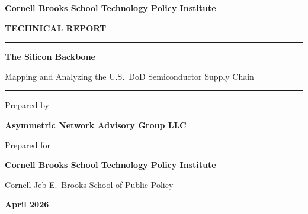 \begin{titlepage}
\thispagestyle{empty}

\noindent\colorbox{carnelian}{%
  \parbox{\dimexpr\textwidth-2\fboxsep}{%
    \centering\vspace{6pt}%
    {\large\color{white}\textbf{Cornell Brooks School Technology Policy Institute}}%
    \vspace{6pt}%
  }%
}\par

\centering

\vspace{1.0in}

{\color{cornellgray}\Large \textbf{TECHNICAL REPORT}}\par

\vspace{0.6in}

{\color{carnelian}\rule{0.6\textwidth}{1pt}}\par
\vspace{0.25in}
{\LARGE \textbf{\color{cornellgray}The Silicon Backbone}}\par
\vspace{0.10in}
{\Large \color{cornellgray}Mapping and Analyzing the U.S.\ DoD Semiconductor Supply Chain}\par
\vspace{0.25in}
{\color{carnelian}\rule{0.6\textwidth}{1pt}}\par

\vspace{0.6in}

{\large\color{cornellgray} Prepared by}\par
\vspace{0.08in}
{\large\textbf{\color{cornellgray}Asymmetric Network Advisory Group LLC}}\par

\vspace{0.4in}

{\large\color{cornellgray} Prepared for}\par
\vspace{0.08in}
{\large\textbf{\color{cornellgray}Cornell Brooks School Technology Policy Institute}}\par
{\large\color{cornellgray}Cornell Jeb E.\ Brooks School of Public Policy}\par

\vfill

{\large\color{cornellgray}\textbf{April 2026}}\par
\vspace{0.25in}


\end{titlepage}
